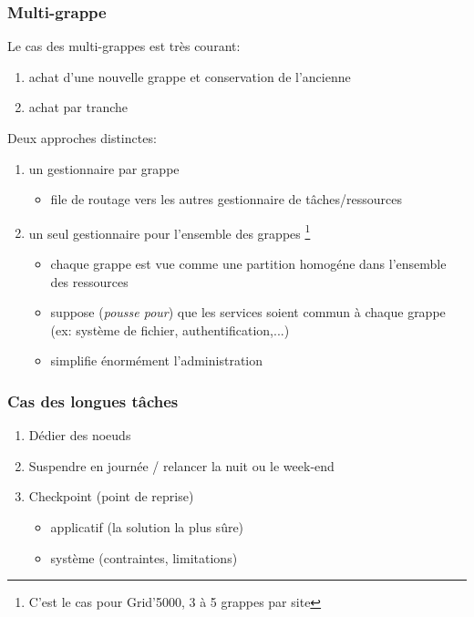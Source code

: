 \documentclass{beamer}
\begin{document}
\begin{frame}
	\frametitle{Multi-grappe}
	Le cas des multi-grappes est très courant:
		\begin{enumerate}
  		\item achat d'une nouvelle grappe et conservation de l'ancienne 
 			\item achat par tranche
		\end{enumerate}
	Deux approches distinctes:
		\begin{enumerate}
  		\item un gestionnaire par grappe
			\begin{itemize}
  			\item file de routage vers les autres gestionnaire de tâches/ressources
			\end{itemize}

 			\item un seul gestionnaire pour l'ensemble des grappes \footnote{C'est le cas pour Grid'5000, 3 à 5 grappes par site}
			\begin{itemize}
  			\item chaque grappe est vue comme une partition homogéne dans l'ensemble des ressources
				\item suppose ({\em pousse pour}) que les services soient commun à chaque grappe (ex: système de fichier, authentification,...)
				\item simplifie énormément l'administration
			\end{itemize}
			 
		\end{enumerate}

\end{frame}



\begin{frame}
	\frametitle{Cas des longues tâches}
		
		\begin{enumerate}
			\item Dédier des noeuds
			\item Suspendre en journée / relancer la nuit ou le week-end
			\item Checkpoint (point de reprise)
			\begin{itemize}
				\item applicatif (la solution la plus sûre)
				\item système (contraintes, limitations)
			\end{itemize}
		\end{enumerate}

\end{frame}
\end{document}
